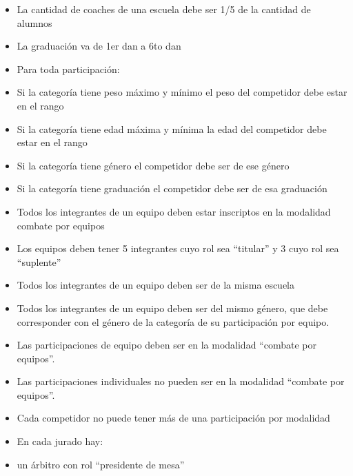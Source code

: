 \documentclass[a4paper]{article}
\begin{document}
\begin{itemize}

\item La cantidad de coaches de una escuela debe ser 1/5 de la cantidad de alumnos

\item La graduación va de 1er dan a 6to dan

\item Para toda participación:

\item Si la categoría tiene peso máximo y mínimo el peso del competidor debe estar en el rango

\item Si la categoría tiene edad máxima y mínima la edad del competidor debe estar en el rango

\item Si la categoría tiene género el competidor debe ser de ese género

\item Si la categoría tiene graduación el competidor debe ser de esa graduación

\item Todos los integrantes de un equipo deben estar inscriptos en la modalidad combate por equipos

\item Los equipos deben tener 5 integrantes cuyo rol sea “titular” y 3 cuyo rol sea “suplente”

\item Todos los integrantes de un equipo deben ser de la misma escuela

\item Todos los integrantes de un equipo deben ser del mismo género, que debe corresponder con el género de la categoría de su participación por equipo.

\item Las participaciones de equipo deben ser en la modalidad “combate por equipos”.

\item Las participaciones individuales no pueden ser en la modalidad “combate por equipos”.

\item Cada competidor no puede tener más de una participación por modalidad

\item En cada jurado hay:

\item un árbitro con rol “presidente de mesa”


\end{itemize}
\end{document}

